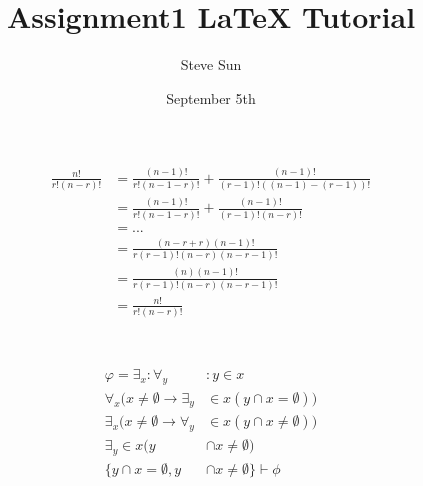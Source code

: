 \documentclass[a4paper]{article}
\title{Assignment1 \LaTeX{} Tutorial}
\author{Steve Sun}
\date{September 5th}
\begin{document}
\maketitle

\section{}

\begin{align*}
\frac{n!}{r!(n - r)!} &= \frac{(n - 1)!}{r!(n - 1 - r)!} + \frac{(n - 1)!}{(r - 1)!((n - 1) - (r - 1))!} \\
&= \frac{(n - 1)!}{r!(n - 1 - r)!} + \frac{(n - 1)!}{(r - 1)!(n - r)!} \\
&= ... \\
&= \frac{(n - r + r)(n - 1)!}{r(r - 1)!(n - r)(n - r - 1)!} \\
&= \frac{(n)(n - 1)!}{r(r - 1)!(n - r)(n - r - 1)!} \\
&= \frac{n!}{r!(n - r)!} \\
\end{align*}

\section{}
\begin{align*}
\varphi = \exists_x :\forall_y &: y \in x \\
\forall_x(x  \neq \emptyset \rightarrow\exists_y & \in x(y \cap x = \emptyset)) \\
\exists_x(x \neq \emptyset \rightarrow\forall_y & \in x(y \cap x \neq \emptyset)) \\
\exists_y \in x(y &\cap x \neq \emptyset) \\
\{y \cap x = \emptyset, y &\cap x \neq \emptyset\} \vdash \phi \\
\end{align*}
\end{document}
